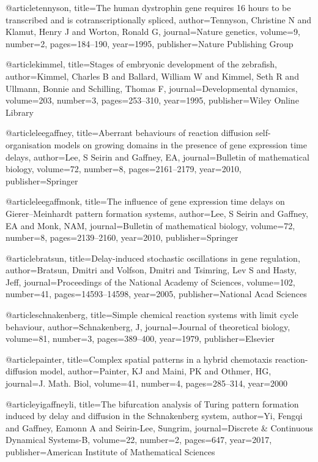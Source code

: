 @article{tennyson,
  title={The human dystrophin gene requires 16 hours to be transcribed and is cotranscriptionally spliced},
  author={Tennyson, Christine N and Klamut, Henry J and Worton, Ronald G},
  journal={Nature genetics},
  volume={9},
  number={2},
  pages={184--190},
  year={1995},
  publisher={Nature Publishing Group}
}

@article{kimmel,
  title={Stages of embryonic development of the zebrafish},
  author={Kimmel, Charles B and Ballard, William W and Kimmel, Seth R and Ullmann, Bonnie and Schilling, Thomas F},
  journal={Developmental dynamics},
  volume={203},
  number={3},
  pages={253--310},
  year={1995},
  publisher={Wiley Online Library}
}

@article{leegaffney,
  title={Aberrant behaviours of reaction diffusion self-organisation models on growing domains in the presence of gene expression time delays},
  author={Lee, S Seirin and Gaffney, EA},
  journal={Bulletin of mathematical biology},
  volume={72},
  number={8},
  pages={2161--2179},
  year={2010},
  publisher={Springer}
}

@article{leegaffmonk,
  title={The influence of gene expression time delays on Gierer--Meinhardt pattern formation systems},
  author={Lee, S Seirin and Gaffney, EA and Monk, NAM},
  journal={Bulletin of mathematical biology},
  volume={72},
  number={8},
  pages={2139--2160},
  year={2010},
  publisher={Springer}
}

@article{bratsun,
  title={Delay-induced stochastic oscillations in gene regulation},
  author={Bratsun, Dmitri and Volfson, Dmitri and Tsimring, Lev S and Hasty, Jeff},
  journal={Proceedings of the National Academy of Sciences},
  volume={102},
  number={41},
  pages={14593--14598},
  year={2005},
  publisher={National Acad Sciences}
}

@article{schnakenberg,
  title={Simple chemical reaction systems with limit cycle behaviour},
  author={Schnakenberg, J},
  journal={Journal of theoretical biology},
  volume={81},
  number={3},
  pages={389--400},
  year={1979},
  publisher={Elsevier}
}

@article{painter,
  title={Complex spatial patterns in a hybrid chemotaxis reaction-diffusion model},
  author={Painter, KJ and Maini, PK and Othmer, HG},
  journal={J. Math. Biol},
  volume={41},
  number={4},
  pages={285--314},
  year={2000}
}

@article{yigaffneyli,
  title={The bifurcation analysis of Turing pattern formation induced by delay and diffusion in the Schnakenberg system},
  author={Yi, Fengqi and Gaffney, Eamonn A and Seirin-Lee, Sungrim},
  journal={Discrete \& Continuous Dynamical Systems-B},
  volume={22},
  number={2},
  pages={647},
  year={2017},
  publisher={American Institute of Mathematical Sciences}
}

